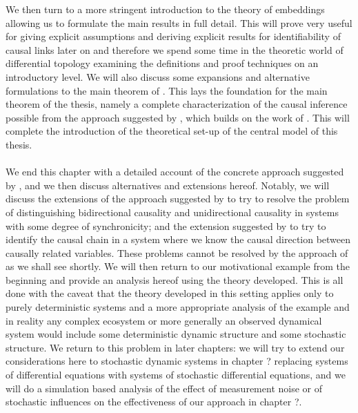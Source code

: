 \documentclass[11pt, a4paper]{memoir}
\theoremstyle{plain}
\theoremstyle{definition}
\begin{document}
We then turn to a more stringent introduction to the theory of embeddings allowing us to formulate the main results in full detail. This will prove very useful for giving explicit assumptions and deriving explicit results for identifiability of causal links later on and therefore we spend some time in the theoretic world of differential topology examining the definitions and proof techniques on an introductory level. We will also discuss some expansions and alternative formulations to the main theorem of \cite{Takens}. This lays the foundation for the main theorem of the thesis, namely a complete characterization of the causal inference possible from the approach suggested by \cite{Sugihara}, which builds on the work of \cite{mathFound}. This will complete the introduction of the theoretical set-up of the central model of this thesis.\\\\
We end this chapter with a detailed account of the concrete approach suggested by \cite{Sugihara}, and we then discuss alternatives and extensions hereof. Notably, we will discuss the extensions of the approach suggested by \cite{Ye2015} to try to resolve the problem of distinguishing bidirectional causality and unidirectional causality in systems with some degree of synchronicity; and the extension suggested by \cite{Leng2020} to try to identify the causal chain in a system where we know the causal direction between causally related variables. These problems cannot be resolved by the approach of \cite{Sugihara} as we shall see shortly. We will then return to our motivational example from the beginning and provide an analysis hereof using the theory developed. This is all done with the caveat that the theory developed in this setting applies only to purely deterministic systems and a more appropriate analysis of the example and in reality any complex ecosystem or more generally an observed dynamical system would include some deterministic dynamic structure and some stochastic structure. We return to this problem in later chapters: we will try to extend our considerations here to stochastic dynamic systems in chapter ? replacing systems of differential equations with systems of stochastic differential equations, and we will do a simulation based analysis of the effect of measurement noise or of stochastic influences on the effectiveness of our approach in chapter ?.
\end{document}
